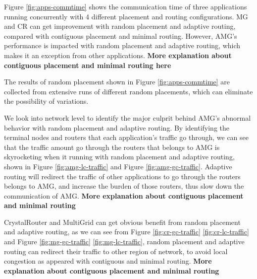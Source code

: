 \documentclass[conference,compsoc]{IEEEtran}
\begin{document}
Figure \ref{fig:apps-commtime} shows the communication time of three applications running concurrently with 4 different placement and routing configurations. MG and CR can get improvement with random placement and adaptive routing, compared with contiguous placement and minimal routing. However, AMG's performance is impacted with random placement and adaptive routing, which makes it an exception from other applications.  \textbf{More explanation about contiguous placement and minimal routing here}

The results of random placement shown in Figure \ref{fig:apps-commtime} are collected from extensive runs of different random placements, which can eliminate the possibility of variations.

We look into network level to identify the major culprit behind AMG's abnormal behavior with random placement and adaptive routing. By identifying the terminal nodes and routers that each application's traffic go through, we can see that the traffic amount go through the routers that belongs to AMG is skyrocketing when it running with random placement and adaptive routing, shown in Figure \ref{fig:amg-lc-traffic} and Figure \ref{fig:amg-gc-traffic}. Adaptive routing will redirect the traffic of other applications to go through the routers belongs to AMG, and increase the burden of those routers, thus slow down the communication of AMG. \textbf{More explanation about contiguous placement and minimal routing}

CrystalRouter and MultiGrid can get obvious benefit from random placement and adaptive routing, as we can see from Figure \ref{fig:cr-gc-traffic} \ref{fig:cr-lc-traffic} and Figure \ref{fig:mg-gc-traffic} \ref{fig:mg-lc-traffic}, random placement and adaptive routing can redirect their traffic to other region of network, to avoid local congestion as appeared with contiguous and minimal routing. \textbf{More explanation about contiguous placement and minimal routing}
\end{document}
